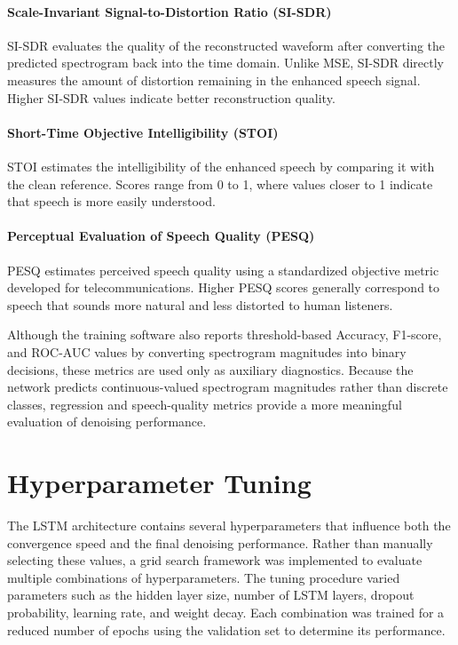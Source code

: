 \documentclass[11pt, letterpaper]{article}
\begin{document}
\paragraph{Scale-Invariant Signal-to-Distortion Ratio (SI-SDR)}
SI-SDR evaluates the quality of the reconstructed waveform after converting the predicted spectrogram back into the time domain. Unlike MSE, SI-SDR directly measures the amount of distortion remaining in the enhanced speech signal. Higher SI-SDR values indicate better reconstruction quality.

\paragraph{Short-Time Objective Intelligibility (STOI)}
STOI estimates the intelligibility of the enhanced speech by comparing it with the clean reference. Scores range from 0 to 1, where values closer to 1 indicate that speech is more easily understood.

\paragraph{Perceptual Evaluation of Speech Quality (PESQ)}
PESQ estimates perceived speech quality using a standardized objective metric developed for telecommunications. Higher PESQ scores generally correspond to speech that sounds more natural and less distorted to human listeners.

Although the training software also reports threshold-based Accuracy, F1-score, and ROC-AUC values by converting spectrogram magnitudes into binary decisions, these metrics are used only as auxiliary diagnostics. Because the network predicts continuous-valued spectrogram magnitudes rather than discrete classes, regression and speech-quality metrics provide a more meaningful evaluation of denoising performance.


\section{Hyperparameter Tuning}

The LSTM architecture contains several hyperparameters that influence both the convergence speed and the final denoising performance. Rather than manually selecting these values, a grid search framework was implemented to evaluate multiple combinations of hyperparameters. The tuning procedure varied parameters such as the hidden layer size, number of LSTM layers, dropout probability, learning rate, and weight decay. Each combination was trained for a reduced number of epochs using the validation set to determine its performance.
\end{document}

